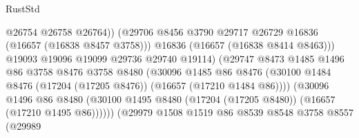 \begin{lexlean}{RustStd}
\begin{coremodule}
                                            @26754
                                            @26758
                                            @26764))
                                        (@29706
                                          @8456
                                          @3790
                                          @29717
                                          @26729
                                          @16836
                                          (@16657 (@16838 @8457 @3758)))
                                        @16836
                                        (@16657 (@16838 @8414 @8463)))
                                      @19093
                                      @19096
                                      @19099
                                      @29736
                                      @29740
                                      @19114)
                                    (@29747
                                      @8473
                                      @1485
                                      @1496
                                      @86
                                      @3758
                                      @8476
                                      @3758
                                      @8480
                                      (@30096
                                        @1485
                                        @86
                                        @8476
                                        (@30100
                                          @1484
                                          @8476
                                          (@17204 (@17205 @8476))
                                          (@16657 (@17210 @1484 @86))))
                                      (@30096
                                        @1496
                                        @86
                                        @8480
                                        (@30100
                                          @1495
                                          @8480
                                          (@17204 (@17205 @8480))
                                          (@16657 (@17210 @1495 @86))))))
                                  (@29979
                                    @1508
                                    @1519
                                    @86
                                    @8539
                                    @8548
                                    @3758
                                    @8557
                                    (@29989

\end{coremodule}
\end{lexlean}
